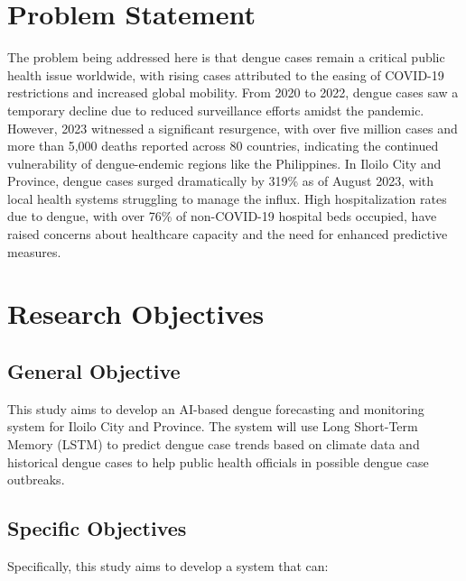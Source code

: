 \section{Problem Statement}
The problem being addressed here is that dengue cases remain a critical public health issue worldwide,
 with rising cases attributed to the easing of COVID-19 restrictions and increased global mobility. 
 From 2020 to 2022, dengue cases saw a temporary decline due to reduced surveillance efforts amidst the pandemic. 
 However, 2023 witnessed a significant resurgence, with over five million cases and more than 5,000 deaths reported 
 across 80 countries, indicating the continued vulnerability of dengue-endemic regions like the Philippines. 
 In Iloilo City and Province, dengue cases surged dramatically by 319\% as of August 2023, 
 with local health systems struggling to manage the influx. High hospitalization rates due to dengue, with over
  76\% of non-COVID-19 hospital beds occupied, have raised concerns about healthcare capacity and the need for enhanced predictive measures. 

\section{Research Objectives}
\label{sec:researchobjectives}

\subsection{General Objective}
\label{sec:generalobjective}

This study aims to develop an AI-based dengue forecasting and monitoring system for Iloilo City and Province. 
The system will use Long Short-Term Memory (LSTM) to predict dengue case trends based on climate data and 
historical dengue cases to help public health officials in possible dengue case outbreaks.


\subsection{Specific Objectives}
\label{sec:specificobjectives}

%
%

Specifically, this study aims to develop a system that can:


